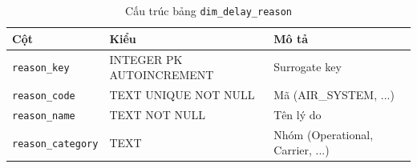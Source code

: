 \begin{table}[H]
\centering
\caption{Cấu trúc bảng \texttt{dim\_delay\_reason}}
\vspace{4pt}
\begin{tabular}{|l|l|l|}
\hline
\textbf{Cột} & \textbf{Kiểu} & \textbf{Mô tả} \\ \hline
\texttt{reason\_key}      & INTEGER PK AUTOINCREMENT & Surrogate key \\ \hline
\texttt{reason\_code}     & TEXT UNIQUE NOT NULL & Mã (AIR\_SYSTEM, ...) \\ \hline
\texttt{reason\_name}     & TEXT NOT NULL & Tên lý do \\ \hline
\texttt{reason\_category} & TEXT & Nhóm (Operational, Carrier, ...) \\ \hline
\end{tabular}
\end{table}
  
